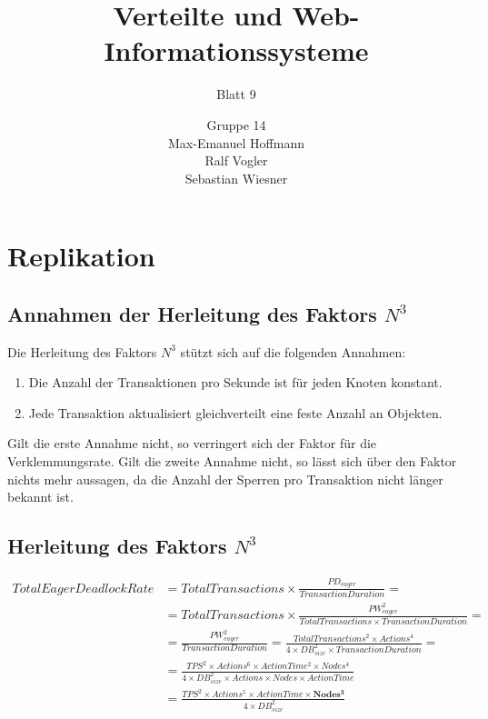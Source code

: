 \documentclass[11pt,a4paper]{scrartcl}
\begin{document}
\author{Gruppe 14\\Max-Emanuel Hoffmann\\Ralf Vogler\\Sebastian Wiesner}
\title{Verteilte und Web-Informationssysteme}
\subtitle{Blatt 9}

\maketitle

\section{Replikation}

\subsection{Annahmen der Herleitung des Faktors $N^3$}

Die Herleitung des Faktors $N^3$ stützt sich auf die folgenden Annahmen:

\begin{enumerate}
\item Die Anzahl der Transaktionen pro Sekunde ist für jeden Knoten konstant.
\item Jede Transaktion aktualisiert gleichverteilt eine feste Anzahl an Objekten.
\end{enumerate}

Gilt die erste Annahme nicht, so verringert sich der Faktor für die
Verklemmungsrate.  Gilt die zweite Annahme nicht, so lässt sich über den Faktor
nichts mehr aussagen, da die Anzahl der Sperren pro Transaktion nicht länger
bekannt ist.

\subsection{Herleitung des Faktors $N^3$}

\begin{align*}
  TotalEagerDeadlockRate &= TotalTransactions \times
  \frac{PD_{eager}}{TransactionDuration} = \\
  &= TotalTransactions \times \frac{PW_{eager}^2}{TotalTransactions
    \times TransactionDuration} = \\
  &= \frac{PW_{eager}^2}{TransactionDuration} = \frac{TotalTransactions^2
    \times Actions^4}{4 \times DB_{size}^2 \times TransactionDuration} = \\
  &= \frac{TPS^2 \times Actions^6 \times ActionTime^2 \times Nodes^4}{4
    \times DB_{size}^2 \times Actions \times Nodes \times ActionTime} \\
  &= \frac{TPS^2 \times Actions^5 \times ActionTime \times \mathbf{Nodes^3}}{4
    \times DB_{size}^2}
\end{align*}
\end{document}
